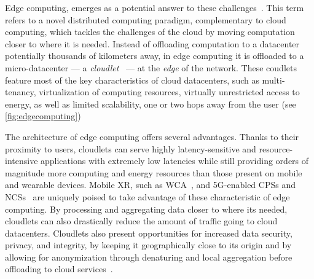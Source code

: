 Edge computing, emerges as a potential answer to these challenges~\cite{satyanarayanan2009case,shi2016promise,shi2016edge,varghese2016challenges,satyanarayanan2017emergence,bittmann2017edge,wang2019towards}.
This term refers to a novel distributed computing paradigm, complementary to cloud computing, which tackles the challenges of the cloud by moving computation closer to where it is needed.
Instead of offloading computation to a datacenter potentially thousands of kilometers away, in edge computing it is offloaded to a micro-datacenter --- a \emph{cloudlet}~\cite{satyanarayanan2009case} --- at the \emph{edge} of the network.
These coudlets feature most of the key characteristics of cloud datacenters, such as multi-tenancy, virtualization of computing resources, virtually unrestricted access to energy, as well as limited scalability, one or two hops away from the user (see \cref{fig:edgecomputing})

The architecture of edge computing offers several advantages.
Thanks to their proximity to users, cloudlets can serve highly latency-sensitive and resource-intensive applications with extremely low latencies while still providing orders of magnitude more computing and energy resources than those present on mobile and wearable devices.
Mobile \gls{XR}, such as \gls{WCA}~\cite{ha2014towards,chen2018application,wang2020scaling,chen2017empirical,chen2018application}, and 5G-enabled \glspl{CPS} and \glspl{NCS}~\cite{sasaki2016vehicle,wang2018bandwidth,wan2020efficient} are uniquely poised to take advantage of these characteristic of edge computing.
By processing and aggregating data closer to where its needed, cloudlets can also drastically reduce the amount of traffic going to cloud datacenters.
Cloudlets also present opportunities for increased data security, privacy, and integrity, by keeping it geographically close to its origin and by allowing for anonymization through denaturing and local aggregation before offloading to cloud services~\cite{satyanarayanan2017emergence}.


\subsection{}

